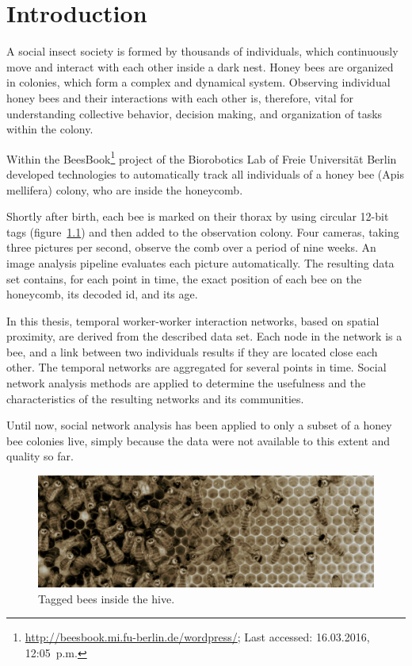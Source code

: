 \chapter{Introduction}
\label{ch:intro}

A social insect society is formed by thousands of individuals, which continuously move and interact with each other inside a dark nest. 
Honey bees are organized in colonies, which form a complex and dynamical system.
Observing individual honey bees and their interactions with each other is, therefore, vital for understanding collective behavior, decision making, and organization of tasks within the colony.

Within the BeesBook\footnote{\url{http://beesbook.mi.fu-berlin.de/wordpress/}; Last accessed: 16.03.2016, 12:05~p.m.} project of the Biorobotics Lab of Freie Universität Berlin~\textcite{wario2015automatic} developed technologies to automatically track all individuals of a honey bee (Apis mellifera) colony, who are inside the honeycomb.

Shortly after birth, each bee is marked on their thorax by using circular 12-bit tags (figure~\ref{fig:markers}) and then added to the observation colony. Four cameras, taking three pictures per second, observe the comb over a period of nine weeks. An image analysis pipeline evaluates each picture automatically. The resulting data set contains, for each point in time, the exact position of each bee on the honeycomb, its decoded id, and its age.

In this thesis, temporal worker-worker interaction networks, based on spatial proximity, are derived from the described data set. Each node in the network is a bee, and a link between two individuals results if they are located close each other. The temporal networks are aggregated for several points in time.  Social network analysis methods are applied to determine the usefulness and the characteristics of the resulting networks and its communities.

Until now, social network analysis has been applied to only a subset of a honey bee colonies live, simply because the data were not available to this extent and quality so far.

\begin{figure}[htb]
	\centering
	\includegraphics[width=1.0\textwidth]{Figures/markers}
	\caption{Tagged bees inside the hive.}
	\label{fig:markers}
\end{figure}

